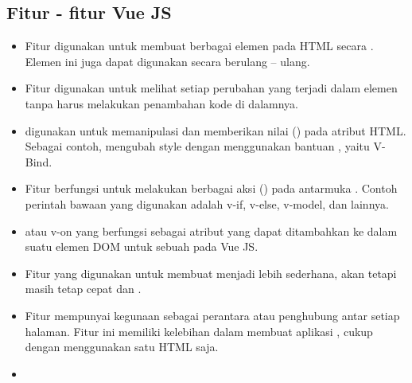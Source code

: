 {{\subsection{Fitur - fitur Vue JS}
\begin{itemize}
  \item {}
  
  Fitur  digunakan untuk membuat berbagai elemen pada HTML secara . Elemen  ini juga dapat digunakan secara berulang – ulang.

  \item {}
  
  Fitur  digunakan untuk melihat setiap perubahan yang terjadi dalam elemen  tanpa harus melakukan penambahan kode di dalamnya.

  \item {}
  
   digunakan untuk memanipulasi dan memberikan nilai () pada atribut HTML. Sebagai contoh, mengubah style dengan menggunakan bantuan , yaitu V-Bind.

  \item {}
  
  Fitur  berfungsi untuk melakukan berbagai aksi () pada antarmuka . Contoh perintah bawaan yang digunakan adalah v-if, v-else, v-model, dan lainnya.

  \item {}
  
   atau v-on yang berfungsi sebagai atribut yang dapat ditambahkan ke dalam suatu elemen DOM untuk sebuah  pada Vue JS.

  \item {}
  
  Fitur  yang digunakan untuk membuat menjadi lebih sederhana, akan tetapi masih tetap cepat dan .

  \item {}
  
  Fitur  mempunyai kegunaan sebagai perantara atau penghubung antar setiap halaman. Fitur ini memiliki kelebihan dalam membuat aplikasi , cukup dengan menggunakan satu  HTML saja.

  \item {}
  

\end{itemize}}}
